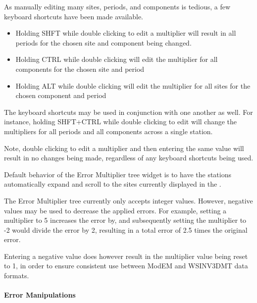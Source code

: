 \documentclass[letterpaper,10pt,english]{sphinxmanual}
\begin{document}
As manually editing many sites, periods, and components is  tedious, a few keyboard shortcuts have been made available.
\begin{itemize}
\item {} 
Holding SHFT while double clicking to edit a multiplier will result in all periods for the chosen site and component being changed.

\item {} 
Holding CTRL while double clicking will edit the multiplier for all components for the chosen site and period

\item {} 
Holding ALT while double clicking will edit the multiplier for all sites for the chosen component and period

\end{itemize}

The keyboard shortcuts may be used in conjunction with one another as well. For instance, holding SHFT+CTRL while double clicking to edit will change the multipliers for all periods and all components across a single station.

Note, double clicking to edit a multiplier and then entering the same value will result in no changes being made, regardless of any keyboard shortcuts being used.

Default behavior of the Error Multiplier tree widget is to have the stations automatically expand and scroll to the sites currently displayed in the {\hyperref[\detokenize{content/data_plot/main_window:plot-window}]{}}.

The Error Multiplier tree currently only accepts integer values. However, negative values may be used to decrease the applied errors.
For example, setting a multiplier to 5 increases the error by, and subsequently setting the multiplier to -2 would divide the error by 2, resulting in a total error of 2.5 times the original error.

Entering a negative value does however result in the multiplier value being reset to 1, in order to ensure consistent use between ModEM and WSINV3DMT data formats.


\paragraph{Error Manipulations}
\label{\detokenize{content/data_plot/main_window:error-manipulations}}\label{\detokenize{content/data_plot/main_window:id10}}
\begin{figure}[htbp]
\centering

\noindent{}
\end{figure}
\end{document}
